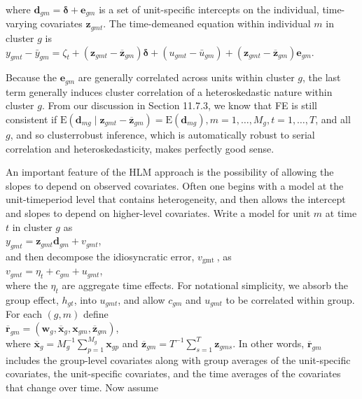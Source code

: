 \documentclass[10pt]{article}
\begin{document}
where $\mathbf{d}_{g m}=\boldsymbol{\delta}+\mathbf{e}_{g m}$ is a set of unit-specific intercepts on the individual, time-varying covariates $\mathbf{z}_{g m t}$. The time-demeaned equation within individual $m$ in cluster $g$ is\\
$y_{g m t}-\bar{y}_{g m}=\zeta_{t}+\left(\mathbf{z}_{g m t}-\overline{\mathbf{z}}_{g m}\right) \boldsymbol{\delta}+\left(u_{g m t}-\bar{u}_{g m}\right)+\left(\mathbf{z}_{g m t}-\overline{\mathbf{z}}_{g m}\right) \mathbf{e}_{g m}$.

Because the $\mathbf{e}_{g m}$ are generally correlated across units within cluster $g$, the last term generally induces cluster correlation of a heteroskedastic nature within cluster $g$. From our discussion in Section 11.7.3, we know that FE is still consistent if $\mathrm{E}\left(\mathbf{d}_{m g} \mid \mathbf{z}_{g m t}-\overline{\mathbf{z}}_{g m}\right)=\mathrm{E}\left(\mathbf{d}_{m g}\right), m=1, \ldots, M_{g}, t=1, \ldots, T$, and all $g$, and so clusterrobust inference, which is automatically robust to serial correlation and heteroskedasticity, makes perfectly good sense.

An important feature of the HLM approach is the possibility of allowing the slopes to depend on observed covariates. Often one begins with a model at the unit-timeperiod level that contains heterogeneity, and then allows the intercept and slopes to depend on higher-level covariates. Write a model for unit $m$ at time $t$ in cluster $g$ as\\
$y_{g m t}=\mathbf{z}_{g m t} \mathbf{d}_{g m}+v_{g m t}$,\\
and then decompose the idiosyncratic error, $v_{\text {gmt }}$, as\\
$v_{g m t}=\eta_{t}+c_{g m}+u_{g m t}$,\\
where the $\eta_{t}$ are aggregate time effects. For notational simplicity, we absorb the group effect, $h_{g t}$, into $u_{g m t}$, and allow $c_{g m}$ and $u_{g m t}$ to be correlated within group. For each $(g, m)$ define\\
$\overline{\mathbf{r}}_{g m}=\left(\mathbf{w}_{g}, \overline{\mathbf{x}}_{g}, \mathbf{x}_{g m}, \overline{\mathbf{z}}_{g m}\right)$,\\
where $\overline{\mathbf{x}}_{g}=M_{g}^{-1} \sum_{p=1}^{M_{g}} \mathbf{x}_{g p}$ and $\overline{\mathbf{z}}_{g m}=T^{-1} \sum_{s=1}^{T} \mathbf{z}_{g m s}$. In other words, $\overline{\mathbf{r}}_{g m}$ includes the group-level covariates along with group averages of the unit-specific covariates, the unit-specific covariates, and the time averages of the covariates that change over time. Now assume
\end{document}
